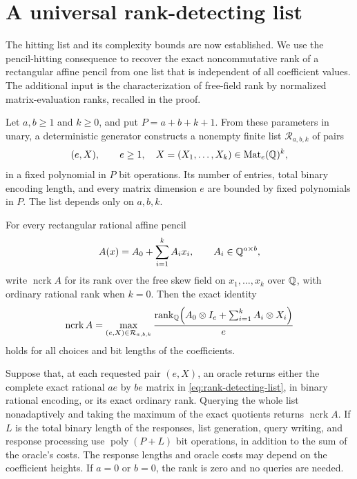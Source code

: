 \section{A universal rank-detecting list}
\label{sec:rank}

The hitting list and its complexity bounds are now established.
We use the pencil-hitting consequence to recover the exact
noncommutative rank of a rectangular affine pencil from one list
that is independent of all coefficient values. The additional input
is the characterization of free-field rank by normalized
matrix-evaluation ranks, recalled in the proof.

\begin{corollary}
\label{cor:rank-detecting-list}
Let $a,b\geq1$ and $k\geq0$, and put $P=a+b+k+1$. From these
parameters in unary, a deterministic generator constructs a nonempty
finite list $\mathcal R_{a,b,k}$ of pairs
\[
 (e,X),\qquad e\geq1,\quad
 X=(X_1,\ldots,X_k)\in\operatorname{Mat}_e(\mathbb Q)^k,
\]
in a fixed polynomial in $P$ bit operations. Its number of entries,
total binary encoding length, and every matrix dimension $e$ are
bounded by fixed polynomials in $P$. The list depends only on $a,b,k$.

For every rectangular rational affine pencil
\[
 A(x)=A_0+\sum_{i=1}^k A_i x_i,\qquad A_i\in\mathbb Q^{a\times b},
\]
write $\operatorname{ncrk}A$ for its rank over the free skew field on
$x_1,\ldots,x_k$ over $\mathbb Q$, with ordinary rational rank when $k=0$.
Then the exact identity
\begin{equation}
 \operatorname{ncrk}A
 =\max_{(e,X)\in\mathcal R_{a,b,k}}
   \frac{\operatorname{rank}_{\mathbb Q}\!\left(A_0\otimes I_e+
             \sum_{i=1}^k A_i\otimes X_i\right)}{e}
 \label{eq:rank-detecting-list}
\end{equation}
holds for all choices and bit lengths of the coefficients.

Suppose that, at each requested pair $(e,X)$, an oracle returns
either the complete exact rational $ae$ by $be$ matrix in
\eqref{eq:rank-detecting-list}, in binary rational encoding, or its
exact ordinary rank. Querying the whole list nonadaptively and taking
the maximum of the exact quotients returns $\operatorname{ncrk}A$.
If $L$ is the total binary length of the responses, list generation,
query writing, and response processing use $\operatorname{poly}(P+L)$
bit operations, in addition to the sum of the oracle's costs.
The response lengths and oracle costs may depend on the coefficient
heights. If $a=0$ or $b=0$, the rank is zero and no queries are needed.
\end{corollary}

